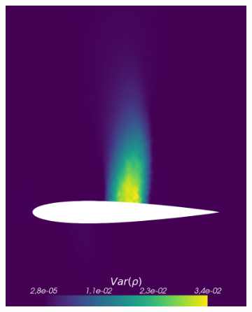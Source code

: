 \begin{figure}[h!]
\begin{subfigure}{0.3\linewidth}
		\includegraphics[scale=0.2]{figs/Euler2D/sc50UncertainMaSigma0-025PSigma1000-0Dim2_VarRho.png}
		\caption{}
		\label{fig:referenceSolutionsub2DVar}
	\end{subfigure}
	\hfill
	\begin{subfigure}{0.3\linewidth}
		\centering

\end{subfigure}
\end{figure}
